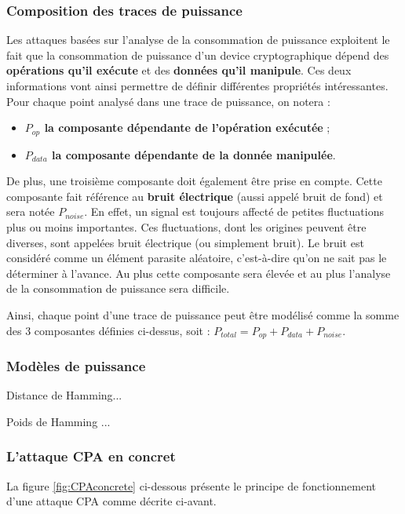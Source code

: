 \documentclass[10pt, oneside, a4paper]{article}
\begin{document}
\subsubsection{Composition des traces de puissance}
Les attaques basées sur l'analyse de la consommation de puissance exploitent le fait que la consommation de puissance d'un device cryptographique dépend des \textbf{opérations qu'il exécute} et des \textbf{données qu'il manipule}. Ces deux informations vont ainsi permettre de définir différentes propriétés intéressantes. Pour chaque point analysé dans une trace de puissance, on notera :
\begin{itemize}
\item \textbf{$P_{op}$ la composante dépendante de l'opération exécutée} ;
\item \textbf{$P_{data}$ la composante dépendante de la donnée manipulée}. \\
\end{itemize}
De plus, une troisième composante doit également être prise en compte. Cette composante fait référence au \textbf{bruit électrique} (aussi appelé bruit de fond) et sera notée \textbf{$P_{noise}$}. En effet, un signal est toujours affecté de petites fluctuations plus ou moins importantes. Ces fluctuations, dont les origines peuvent être diverses, sont appelées bruit électrique (ou simplement bruit). Le bruit est considéré comme un élément parasite aléatoire, c'est-à-dire qu'on ne sait pas le déterminer à l'avance. Au plus cette composante sera élevée et au plus l'analyse de la consommation de puissance sera difficile.

Ainsi, chaque point d'une trace de puissance peut être modélisé comme la somme des 3 composantes définies ci-dessus, soit : 
$P_{total} = P_{op} + P_{data} + P_{noise}$.

\subsubsection{Modèles de puissance}

Distance de Hamming...

Poids de Hamming ...

\subsubsection{L'attaque CPA en concret}

La figure \ref{fig:CPAconcrete} ci-dessous présente le principe de fonctionnement d'une attaque CPA comme décrite ci-avant.
\end{document}
